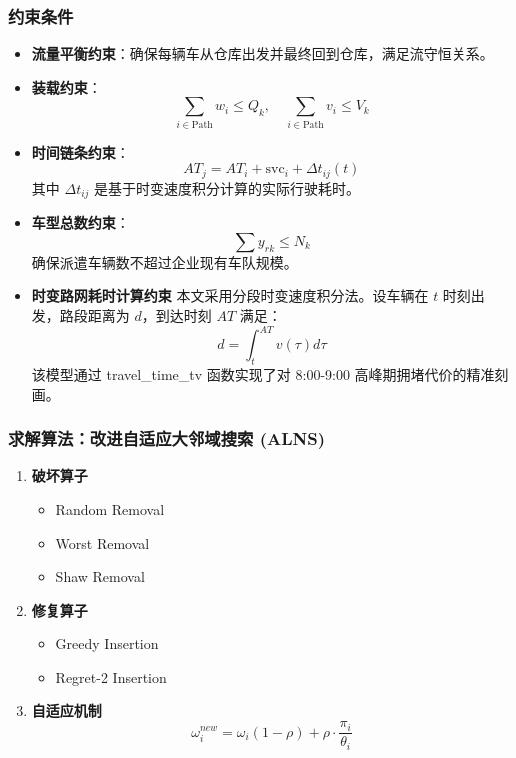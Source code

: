 \documentclass[12pt,a4paper]{article}
\begin{document}
\subsubsection{约束条件}
\begin{itemize}
    \item \textbf{流量平衡约束}：确保每辆车从仓库出发并最终回到仓库，满足流守恒关系。
    \item \textbf{装载约束}：
    \[
    \sum_{i \in \text{Path}} w_i \le Q_k, \quad \sum_{i \in \text{Path}} v_i \le V_k
    \]
    \item \textbf{时间链条约束}：
    \[
    AT_j = AT_i + \text{svc}_i + \Delta t_{ij}(t)
    \]
    其中 \(\Delta t_{ij}\) 是基于时变速度积分计算的实际行驶耗时。
    \item \textbf{车型总数约束}：
    \[
    \sum y_{rk} \le N_k
    \]
    确保派遣车辆数不超过企业现有车队规模。
    \item \textbf{时变路网耗时计算约束}
    本文采用分段时变速度积分法。设车辆在 $t$ 时刻出发，路段距离为 $d$，到达时刻 $AT$ 满足：$$d = \int_{t}^{AT} v(\tau) d\tau$$该模型通过 travel\_time\_tv 函数实现了对 8:00-9:00 高峰期拥堵代价的精准刻画。
\end{itemize}

\subsubsection{求解算法：改进自适应大邻域搜索 (ALNS)}
\begin{enumerate}
    \item \textbf{破坏算子}
            \begin{itemize}
            \item Random Removal
            \item Worst Removal
            \item Shaw Removal
            \end{itemize}
    \item \textbf{修复算子}
            \begin{itemize}
            \item Greedy Insertion
            \item Regret-2 Insertion
            \end{itemize}
    \item \textbf{自适应机制}
    \begin{equation}
\omega_{i}^{new} = \omega_i (1-\rho) + \rho \cdot \frac{\pi_i}{\theta_i}
\end{equation}
\end{enumerate}
\end{document}
